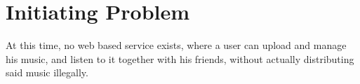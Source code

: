 \section{Initiating Problem}
At this time, no web based service exists, where a user can upload and manage 
his music, and listen to it together with his friends,
without actually distributing said music illegally.